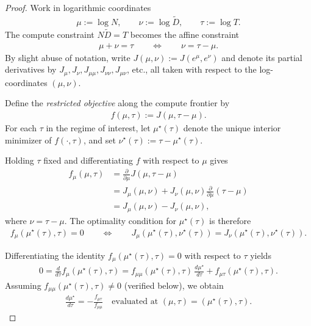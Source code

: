 \documentclass[twoside]{article}
\begin{document}
\begin{proof}
Work in logarithmic coordinates
\begin{align}
    \mu := \log N, \qquad \nu := \log \widetilde{D}, \qquad \tau := \log T.
\end{align}
The compute constraint $N\widetilde{D} = T$ becomes the affine constraint
\begin{align}
    \mu + \nu = \tau
    \qquad \Longleftrightarrow \qquad
    \nu = \tau - \mu.
    \label{eq:log-constraint-mu-nu}
\end{align}
By slight abuse of notation, write $J(\mu, \nu) := J(e^\mu, e^\nu)$ and denote its partial derivatives by $J_\mu, J_\nu, J_{\mu\mu}, J_{\nu\nu}, J_{\mu\nu}$, etc., all taken with respect to the log-coordinates $(\mu, \nu)$.

Define the \emph{restricted objective} along the compute frontier by
\begin{align}
    f(\mu, \tau) := J(\mu, \tau - \mu).
\end{align}
For each $\tau$ in the regime of interest, let $\mu^\star(\tau)$ denote the unique interior minimizer of $f(\cdot, \tau)$, and set $\nu^\star(\tau) := \tau - \mu^\star(\tau)$.

Holding $\tau$ fixed and differentiating $f$ with respect to $\mu$ gives
\begin{align}
    f_\mu(\mu, \tau)
    &= \frac{\partial}{\partial\mu} J(\mu, \tau - \mu) \nonumber\\
    &= J_\mu(\mu, \nu) + J_\nu(\mu, \nu) \frac{\partial}{\partial\mu}(\tau - \mu) \nonumber\\
    &= J_\mu(\mu, \nu) - J_\nu(\mu, \nu),
    \label{eq:fmu}
\end{align}
where $\nu = \tau - \mu$. The optimality condition for $\mu^\star(\tau)$ is therefore
\begin{align}
    f_\mu(\mu^\star(\tau), \tau) = 0
    \qquad \Longleftrightarrow \qquad
    J_\mu(\mu^\star(\tau), \nu^\star(\tau)) = J_\nu(\mu^\star(\tau), \nu^\star(\tau)).
    \label{eq:restricted-FOC}
\end{align}

Differentiating the identity $f_\mu(\mu^\star(\tau), \tau) = 0$ with respect to $\tau$ yields
\begin{align}
    0 = \frac{d}{d\tau} f_\mu(\mu^\star(\tau), \tau)
    = f_{\mu\mu}(\mu^\star(\tau), \tau) \, \frac{d\mu^\star}{d\tau}
      + f_{\mu\tau}(\mu^\star(\tau), \tau).
    \label{eq:IFT-start}
\end{align}
Assuming $f_{\mu\mu}(\mu^\star(\tau), \tau) \neq 0$ (verified below), we obtain
\begin{align}
    \frac{d\mu^\star}{d\tau}
    = -\frac{f_{\mu\tau}}{f_{\mu\mu}}
    \quad \text{evaluated at } (\mu, \tau) = (\mu^\star(\tau), \tau).
    \label{eq:IFT-compact}
\end{align}


\end{proof}
\end{document}
